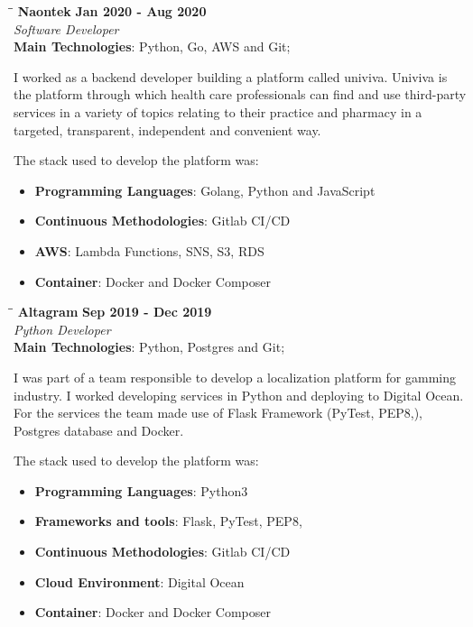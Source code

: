 \documentclass[margin]{res}
\begin{document}
\begin{resume}
\vspace{-0.1in}
   \begin{tabbing}
   \hspace{2.3in}\= \hspace{1.7in}\= \kill
    \textbf{Naontek}    \>\>\textbf{Jan 2020 - Aug 2020}\\
    \textit{Software Developer}\\        
    \textbf{Main Technologies}: Python, Go, AWS and Git;
   \end{tabbing}\vspace{-20pt}
    \vspace{2mm}
I worked as a backend developer building a platform called univiva. Univiva is the platform through which
health care professionals can find and use third-party services in a variety of topics relating to their
practice and pharmacy in a targeted, transparent, independent and convenient way.

The stack used to develop the platform was:
    \begin{itemize}
		    \item \textbf{Programming Languages}: Golang, Python and JavaScript 
		    \item \textbf{Continuous Methodologies}: Gitlab CI/CD    
		    \item \textbf{AWS}: Lambda Functions, SNS, S3, RDS
            \item \textbf{Container}: Docker and Docker Composer   
    \end{itemize}

\vspace{-0.1in}
   \begin{tabbing}
   \hspace{2.3in}\= \hspace{1.7in}\= \kill
    \textbf{Altagram}    \>\>\textbf{Sep 2019 - Dec 2019}\\
    \textit{Python Developer}\\        
    \textbf{Main Technologies}: Python, Postgres and Git;
   \end{tabbing}\vspace{-20pt}
    \vspace{2mm}
I was part of a team responsible to develop a localization platform for gamming industry.
I worked developing services in Python and deploying to Digital Ocean. For the services the team
made use of Flask Framework (PyTest, PEP8,), Postgres database and Docker.

The stack used to develop the platform was:
    \begin{itemize}
		    \item \textbf{Programming Languages}: Python3
            \item \textbf{Frameworks and tools}: Flask, PyTest, PEP8, 
		    \item \textbf{Continuous Methodologies}: Gitlab CI/CD    
		    \item \textbf{Cloud Environment}: Digital Ocean
            \item \textbf{Container}: Docker and Docker Composer   
    \end{itemize}



\end{resume}
\end{document}
